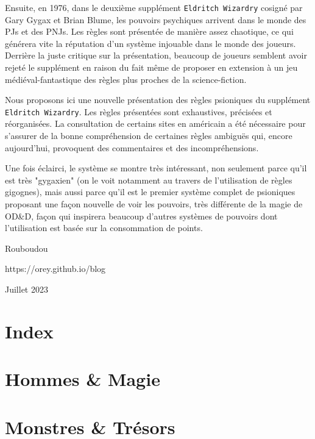 \documentclass[12pt]{article}
\begin{document}
Ensuite, en 1976, dans le deuxième supplément \texttt{Eldritch Wizardry} cosigné par Gary Gygax et Brian Blume, les pouvoirs psychiques arrivent dans le monde des PJs et des PNJs. Les règles sont présentée de manière assez chaotique, ce qui générera vite la réputation d'un système injouable dans le monde des joueurs. Derrière la juste critique sur la présentation, beaucoup de joueurs semblent avoir rejeté le supplément en raison du fait même de proposer en extension à un jeu médiéval-fantastique des règles plus proches de la science-fiction.

Nous proposons ici une nouvelle présentation des règles psioniques du supplément \texttt{Eldritch Wizardry}. Les règles présentées sont exhaustives, précisées et réorganisées. La consultation de certains sites en américain a été nécessaire pour s'assurer de la bonne compréhension de certaines règles ambiguës qui, encore aujourd'hui, provoquent des commentaires et des incompréhensions.

Une fois éclairci, le système se montre très intéressant, non seulement parce qu'il est très "gygaxien" (on le voit notamment au travers de l'utilisation de règles gigognes), mais aussi parce qu'il est le premier système complet de psioniques proposant une façon nouvelle de voir les pouvoirs, très différente de la magie de OD\&D, façon qui inspirera beaucoup d'autres systèmes de pouvoirs dont l'utilisation est basée sur la consommation de points.

\vspace{1cm}

\noindent Rouboudou

\noindent https://orey.github.io/blog

\noindent Juillet 2023

\newpage

\section*{Index}

\newpage

\section*{Hommes \& Magie}


\newpage

\section*{Monstres \& Trésors}
\end{document}
